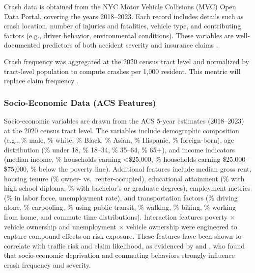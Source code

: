 \documentclass[
  number,
  review,
  3p]{elsarticle}
\begin{document}
Crash data is obtained from the NYC Motor Vehicle Collisions (MVC) Open
Data Portal, covering the years 2018--2023. Each record includes details
such as crash location, number of injuries and fatalities, vehicle type,
and contributing factors (e.g., driver behavior, environmental
conditions). These variables are well-documented predictors of both
accident severity and insurance claims \citep{adeniyi, dong}.

Crash frequency was aggregated at the 2020 census tract level and
normalized by tract-level population to compute crashes per 1,000
resident. This mentric will replace claim frequency \citep{brubacher}.

\subsubsection{Socio-Economic Data (ACS
Features)}\label{socio-economic-data-acs-features}

Socio-economic variables are drawn from the ACS 5-year estimates
(2018--2023) at the 2020 census tract level. The variables include
demographic composition (e.g., \% male, \% white, \% Black, \% Asian, \%
Hispanic, \% foreign-born), age distribution (\% under 18, \% 18--34, \%
35--64, \% 65+), and income indicators (median income, \% households
earning \textless\$25,000, \% households earning \$25,000--\$75,000, \%
below the poverty line). Additional features include median gross rent,
housing tenure (\% owner- vs.~renter-occupied), educational attainment
(\% with high school diploma, \% with bachelor's or graduate degrees),
employment metrics (\% in labor force, unemployment rate), and
transportation factors (\% driving alone, \% carpooling, \% using public
transit, \% walking, \% biking, \% working from home, and commute time
distributions). Interaction features poverty × vehicle ownership and
unemployment × vehicle ownership were engineered to capture compound
effects on risk exposure. These features have been shown to correlate
with traffic risk and claim likelihood, as evidenced by
\citet{brubacher} and \citet{cabrera}, who found that socio-economic
deprivation and commuting behaviors strongly influence crash frequency
and severity.
\end{document}
